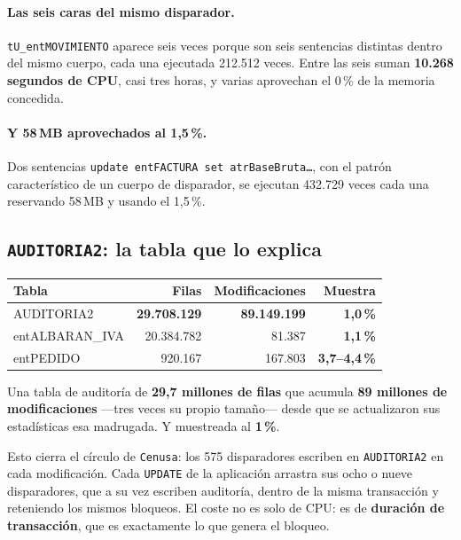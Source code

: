 \documentclass[11pt,a4paper]{article}
\newcommand{\cod}[1]{\texttt{\small #1}}
\newcommand{\critico}[1]{\textcolor{rojo}{\textbf{#1}}}
\newcommand{\aviso}[1]{\textcolor{ambar}{\textbf{#1}}}
\begin{document}
\paragraph{Las seis caras del mismo disparador.}
\cod{tU\_entMOVIMIENTO} aparece seis veces porque son seis sentencias
distintas dentro del mismo cuerpo, cada una ejecutada 212.512 veces. Entre
las seis suman \textbf{10.268 segundos de CPU}, casi tres horas, y varias
aprovechan el 0\,\% de la memoria concedida.

\paragraph{Y 58\,MB aprovechados al 1,5\,\%.} Dos sentencias
\cod{update entFACTURA set atrBaseBruta\ldots}, con el patrón característico
de un cuerpo de disparador, se ejecutan 432.729 veces cada una reservando
58\,MB y usando el 1,5\,\%.

\subsection{\cod{AUDITORIA2}: la tabla que lo explica}

\begin{table}[h]
\centering
\small
\begin{tabular}{lrrr}
\toprule
\textbf{Tabla} & \textbf{Filas} & \textbf{Modificaciones} & \textbf{Muestra} \\
\midrule
AUDITORIA2       & \critico{29.708.129} & \critico{89.149.199} & \critico{1,0\,\%} \\
entALBARAN\_IVA  & 20.384.782 &  81.387 & \critico{1,1\,\%} \\
entPEDIDO        &    920.167 & 167.803 & \aviso{3,7--4,4\,\%} \\
\bottomrule
\end{tabular}
\end{table}

Una tabla de auditoría de \textbf{29,7 millones de filas} que acumula
\textbf{89 millones de modificaciones} —tres veces su propio tamaño— desde
que se actualizaron sus estadísticas esa madrugada. Y muestreada al
\textbf{1\,\%}.

Esto cierra el círculo de \cod{Cenusa}: los 575 disparadores escriben en
\cod{AUDITORIA2} en cada modificación. Cada \cod{UPDATE} de la aplicación
arrastra sus ocho o nueve disparadores, que a su vez escriben auditoría,
dentro de la misma transacción y reteniendo los mismos bloqueos. El coste no
es solo de CPU: es de \textbf{duración de transacción}, que es exactamente lo
que genera el bloqueo.
\end{document}
